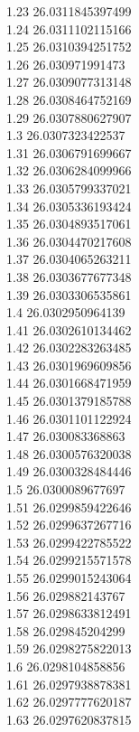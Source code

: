 {1.23	26.0311845397499\\
1.24	26.0311102115166\\
1.25	26.0310394251752\\
1.26	26.030971991473\\
1.27	26.0309077313148\\
1.28	26.0308464752169\\
1.29	26.0307880627907\\
1.3	26.0307323422537\\
1.31	26.0306791699667\\
1.32	26.0306284099966\\
1.33	26.0305799337021\\
1.34	26.0305336193424\\
1.35	26.0304893517061\\
1.36	26.0304470217608\\
1.37	26.0304065263211\\
1.38	26.0303677677348\\
1.39	26.0303306535861\\
1.4	26.0302950964139\\
1.41	26.0302610134462\\
1.42	26.0302283263485\\
1.43	26.0301969609856\\
1.44	26.0301668471959\\
1.45	26.0301379185788\\
1.46	26.0301101122924\\
1.47	26.030083368863\\
1.48	26.0300576320038\\
1.49	26.0300328484446\\
1.5	26.0300089677697\\
1.51	26.0299859422646\\
1.52	26.0299637267716\\
1.53	26.0299422785522\\
1.54	26.0299215571578\\
1.55	26.0299015243064\\
1.56	26.029882143767\\
1.57	26.0298633812491\\
1.58	26.029845204299\\
1.59	26.0298275822013\\
1.6	26.0298104858856\\
1.61	26.0297938878381\\
1.62	26.0297777620187\\
1.63	26.0297620837815\\
}
